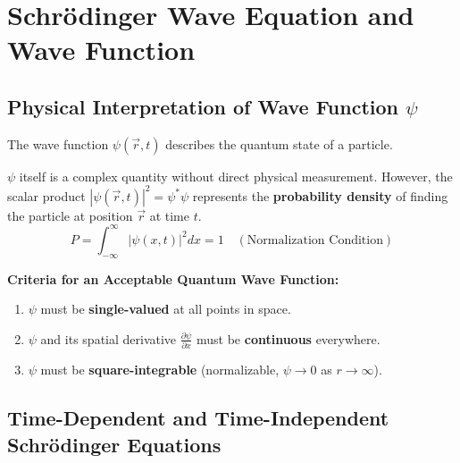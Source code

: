 \documentclass[12pt,a4paper]{article}
\begin{document}
\section{Schrödinger Wave Equation and Wave Function}

\subsection{Physical Interpretation of Wave Function \texorpdfstring{$\psi$}{psi}}

The wave function $\psi(\vec{r}, t)$ describes the quantum state of a particle.

\begin{tcolorbox}[defbox, title={\textbf{Born's Probability Interpretation of Wave Function}}]
$\psi$ itself is a complex quantity without direct physical measurement. However, the scalar product $|\psi(\vec{r},t)|^2 = \psi^* \psi$ represents the \textbf{probability density} of finding the particle at position $\vec{r}$ at time $t$.
\begin{equation}
P = \int_{-\infty}^{\infty} |\psi(x,t)|^2 dx = 1 \quad (\text{Normalization Condition})
\end{equation}
\end{tcolorbox}

\textbf{Criteria for an Acceptable Quantum Wave Function:}\par\noindent
\begin{enumerate}[leftmargin=*, itemsep=2pt]
  \item $\psi$ must be \textbf{single-valued} at all points in space.
  \item $\psi$ and its spatial derivative $\frac{\partial\psi}{\partial x}$ must be \textbf{continuous} everywhere.
  \item $\psi$ must be \textbf{square-integrable} (normalizable, $\psi \to 0$ as $r \to \infty$).
\end{enumerate}

\subsection{Time-Dependent and Time-Independent Schrödinger Equations}
\end{document}
